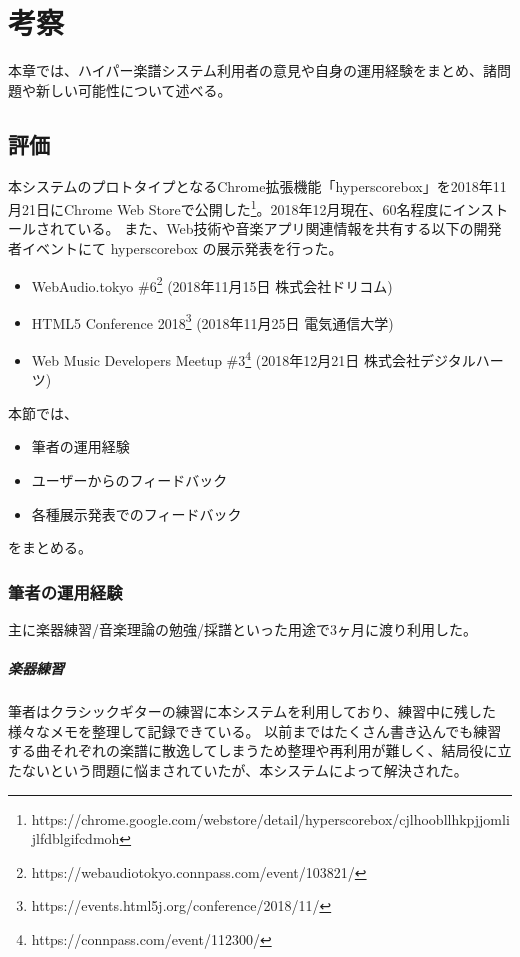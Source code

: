 \chapter{考察}
\label{chap:kosatsu}

本章では、ハイパー楽譜システム利用者の意見や自身の運用経験をまとめ、諸問題や新しい可能性について述べる。

\newpage

\section{評価}
本システムのプロトタイプとなるChrome拡張機能「hyperscorebox」を2018年11月21日にChrome Web Storeで公開した\footnote{\textsf{https://chrome.google.com/webstore/detail/hyperscorebox/cjlhoobllhkpjjomlijlfdblgifcdmoh}}。2018年12月現在、60名程度にインストールされている。
また、Web技術や音楽アプリ関連情報を共有する以下の開発者イベントにて hyperscorebox の展示発表を行った。
\begin{itemize}
    \item WebAudio.tokyo \#6\footnote{\textsf{https://webaudiotokyo.connpass.com/event/103821/}} (2018年11月15日 株式会社ドリコム)
    \item HTML5 Conference 2018\footnote{\textsf{https://events.html5j.org/conference/2018/11/}} (2018年11月25日 電気通信大学)
    \item Web Music Developers Meetup \#3\footnote{\textsf{https://connpass.com/event/112300/}} (2018年12月21日 株式会社デジタルハーツ)
\end{itemize}
本節では、
\begin{itemize}
    \item 筆者の運用経験
    \item ユーザーからのフィードバック
    \item 各種展示発表でのフィードバック
\end{itemize}
をまとめる。

\subsection{筆者の運用経験}
主に楽器練習/音楽理論の勉強/採譜といった用途で3ヶ月に渡り利用した。
\paragraph*{楽器練習}
筆者はクラシックギターの練習に本システムを利用しており、練習中に残した様々なメモを整理して記録できている。
以前まではたくさん書き込んでも練習する曲それぞれの楽譜に散逸してしまうため整理や再利用が難しく、結局役に立たないという問題に悩まされていたが、本システムによって解決された。

